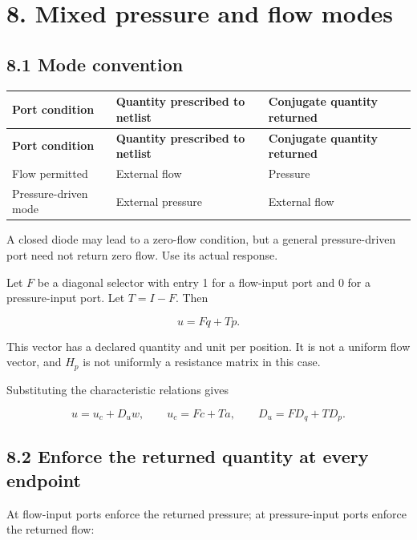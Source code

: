 \documentclass[11pt,a4paper]{article}
\begin{document}
\section{8. Mixed pressure and flow modes}
\subsection{8.1 Mode convention}

\begingroup\footnotesize
\setlength{\tabcolsep}{4pt}
\renewcommand{\arraystretch}{1.17}
\begin{longtable}{>{\raggedright\arraybackslash}p{}>{\raggedright\arraybackslash}p{}>{\raggedright\arraybackslash}p{}}
\toprule
\textbf{Port condition} & \textbf{Quantity prescribed to netlist} & \textbf{Conjugate quantity returned} \\
\midrule
\endfirsthead
\textbf{Port condition} & \textbf{Quantity prescribed to netlist} & \textbf{Conjugate quantity returned} \\
\midrule
\endhead
\bottomrule
\endfoot
Flow permitted & External flow & Pressure \\[3pt]
Pressure-driven mode & External pressure & External flow \\[3pt]
\end{longtable}
\endgroup
A closed diode may lead to a zero-flow condition, but a general pressure-driven port need not return zero flow. Use its actual response.

Let \(F\) be a diagonal selector with entry 1 for a flow-input port and 0 for a pressure-input port. Let \(T=I-F\). Then


\nopagebreak[3]
\[
u=Fq+Tp.
\]


This vector has a declared quantity and unit per position. It is not a uniform flow vector, and \(H_p\) is not uniformly a resistance matrix in this case.

Substituting the characteristic relations gives


\nopagebreak[3]
\[
u=u_c+D_uw,\qquad u_c=Fc+Ta,\qquad D_u=FD_q+TD_p.
\]


\subsection{8.2 Enforce the returned quantity at every endpoint}
At flow-input ports enforce the returned pressure; at pressure-input ports enforce the returned flow:
\end{document}
